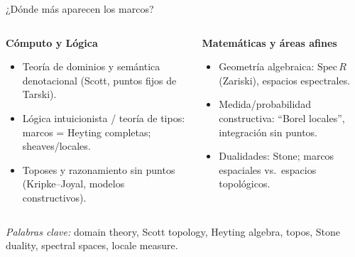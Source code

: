 \documentclass[compress,12pt]{beamer}
\begin{document}
\begin{frame}[t]{¿Dónde más aparecen los marcos?}
\footnotesize
\begin{columns}[T,totalwidth=\textwidth]
  \begin{column}{0.49\textwidth}
    \textbf{Cómputo y Lógica}
    \begin{itemize}\setlength{\itemsep}{2pt}
      \item Teoría de dominios y semántica denotacional (Scott, puntos fijos de Tarski).
      \item Lógica intuicionista / teoría de tipos: marcos = Heyting completas; sheaves/locales.
      \item Toposes y razonamiento sin puntos (Kripke–Joyal, modelos constructivos).
    \end{itemize}
  \end{column}

  \begin{column}{0.49\textwidth}
   \textbf{Matemáticas y áreas afines}
    \begin{itemize}\setlength{\itemsep}{2pt}
      \item Geometría algebraica: $\mathrm{Spec}\,R$ (Zariski), espacios espectrales.
      \item Medida/probabilidad constructiva: “Borel locales”, integración sin puntos.
      \item Dualidades: Stone; marcos espaciales vs.\ espacios topológicos.
    \end{itemize}
  \end{column}
\end{columns}

\vspace{0.25em}
{\scriptsize \textit{Palabras clave:} domain theory, Scott topology, Heyting algebra, topos, Stone duality, spectral spaces, locale measure.}
\end{frame}
\end{document}
